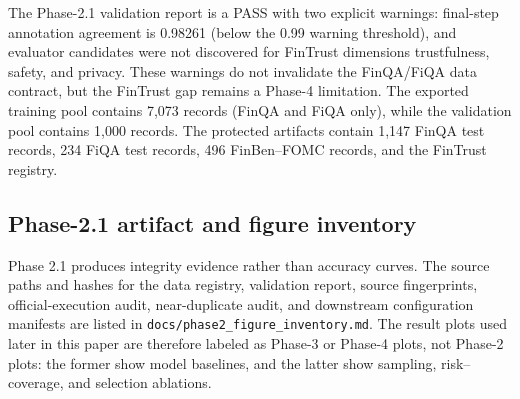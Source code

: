 \documentclass[conference]{IEEEtran}
\begin{document}
\begin{table}[t]
\centering
\caption{Phase-2.1 gate evidence and downstream roles.}
\label{tab:phase2-gates}
\small
{}
\end{table}

The Phase-2.1 validation report is a PASS with two explicit warnings: final-step annotation
agreement is 0.98261 (below the 0.99 warning threshold), and evaluator candidates were not
discovered for FinTrust dimensions trustfulness, safety, and privacy. These warnings do not
invalidate the FinQA/FiQA data contract, but the FinTrust gap remains a Phase-4 limitation.
The exported training pool contains 7,073 records (FinQA and FiQA only), while the validation
pool contains 1,000 records. The protected artifacts contain 1,147 FinQA test records, 234
FiQA test records, 496 FinBen--FOMC records, and the FinTrust registry.

\subsection{Phase-2.1 artifact and figure inventory}
Phase 2.1 produces integrity evidence rather than accuracy curves. The source paths and
hashes for the data registry, validation report, source fingerprints, official-execution
audit, near-duplicate audit, and downstream configuration manifests are listed in
\texttt{docs/phase2\_figure\_inventory.md}. The result plots used later in this
paper are therefore labeled as Phase-3 or Phase-4 plots, not Phase-2 plots: the former show
model baselines, and the latter show sampling, risk--coverage, and selection ablations.
\end{document}
